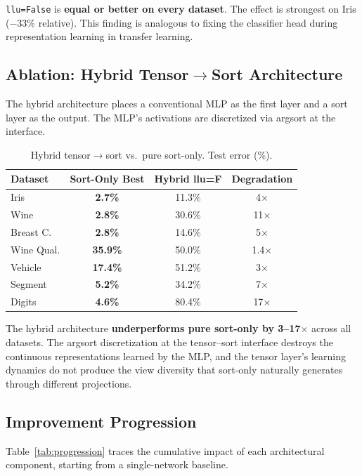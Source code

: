 \documentclass[12pt]{article}
\begin{document}
\texttt{llu=False} is \textbf{equal or better on every dataset}. The effect is strongest on Iris ($-$33\% relative). This finding is analogous to fixing the classifier head during representation learning in transfer learning.

\subsection{Ablation: Hybrid Tensor$\to$Sort Architecture}

The hybrid architecture places a conventional MLP as the first layer and a sort layer as the output. The MLP's activations are discretized via argsort at the interface.

\begin{table}[ht]
\centering
\caption{Hybrid tensor$\to$sort vs.\ pure sort-only. Test error (\%).}
\label{tab:hybrid}
\begin{tabular}{lccc}
\toprule
Dataset & Sort-Only Best & Hybrid llu=F & Degradation \\
\midrule
Iris         & \textbf{2.7\%}  & 11.3\% & 4$\times$ \\
Wine         & \textbf{2.8\%}  & 30.6\% & 11$\times$ \\
Breast C.    & \textbf{2.8\%}  & 14.6\% & 5$\times$ \\
Wine Qual.   & \textbf{35.9\%} & 50.0\% & 1.4$\times$ \\
Vehicle      & \textbf{17.4\%} & 51.2\% & 3$\times$ \\
Segment      & \textbf{5.2\%}  & 34.2\% & 7$\times$ \\
Digits       & \textbf{4.6\%}  & 80.4\% & 17$\times$ \\
\bottomrule
\end{tabular}
\end{table}

The hybrid architecture \textbf{underperforms pure sort-only by 3--17$\times$} across all datasets. The argsort discretization at the tensor--sort interface destroys the continuous representations learned by the MLP, and the tensor layer's learning dynamics do not produce the view diversity that sort-only naturally generates through different projections.

\subsection{Improvement Progression}

Table~\ref{tab:progression} traces the cumulative impact of each architectural component, starting from a single-network baseline.
\end{document}
